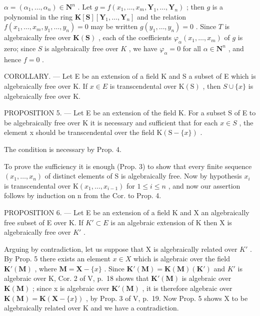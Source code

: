 \(\alpha = (\alpha_{1}, \ldots, \alpha_{n}) \in \mathbf{N}^{n}\) . Let \(g = f(x_{1}, \ldots, x_{m}, \mathbf{Y}_{1}, \ldots, \mathbf{Y}_{n})\) ; then \(g\) is a polynomial in the ring \(\mathbf{K}[\mathbf{S}][\mathbf{Y}_{1}, \ldots, \mathbf{Y}_{n}]\) and the relation \(f(x_{1}, \ldots, x_{m}, y_{1}, \ldots, y_{n}) = 0\) may be written \(g(y_{1}, \ldots, y_{n}) = 0\) . Since \(T\) is algebraically free over \(\mathbf{K}(\mathbf{S})\) , each of the coefficients \(\varphi_{\alpha}(x_{1}, \ldots, x_{m})\) of \(g\) is zero; since \(S\) is algebraically free over \(K\) , we have \(\varphi_{\alpha} = 0\) for all \(\alpha \in \mathbf{N}^{n}\) , and hence \(f = 0\) .

COROLLARY. --- Let E be an extension of a field K and S a subset of E which is algebraically free over K. If \(x \in E\) is transcendental over \(\mathrm{K}(\mathrm{S})\) , then \(S \cup \{x\}\) is algebraically free over K.

PROPOSITION 5. --- Let E be an extension of the field K. For a subset S of E to be algebraically free over K it is necessary and sufficient that for each \(x \in S\) , the element x should be transcendental over the field \(\mathrm{K}(\mathrm{S} - \{x\})\) .

The condition is necessary by Prop. 4.

To prove the sufficiency it is enough (Prop. 3) to show that every finite sequence \((x_{1},\ldots,x_{n})\) of distinct elements of S is algebraically free. Now by hypothesis \(x_{i}\) is transcendental over \(\mathrm{K}(x_{1},\ldots,x_{i-1})\) for \(1\leqslant i\leqslant n\) , and now our assertion follows by induction on n from the Cor. to Prop. 4.

PROPOSITION 6. --- Let E be an extension of a field K and X an algebraically free subset of E over K. If \(K' \subset E\) is an algebraic extension of K then X is algebraically free over \(K'\) .

Arguing by contradiction, let us suppose that X is algebraically related over \(K'\) . By Prop. 5 there exists an element \(x \in X\) which is algebraic over the field \(\mathbf{K}'(\mathbf{M})\) , where \(\mathbf{M} = \mathbf{X} - \{x\}\) . Since \(\mathbf{K}'(\mathbf{M}) = \mathbf{K}(\mathbf{M})(\mathbf{K}')\) and \(K'\) is algebraic over K, Cor. 2 of V, p.~18 shows that \(\mathbf{K}'(\mathbf{M})\) is algebraic over \(\mathbf{K}(\mathbf{M})\) ; since x is algebraic over \(\mathbf{K}'(\mathbf{M})\) , it is therefore algebraic over \(\mathbf{K}(\mathbf{M}) = \mathbf{K}(\mathbf{X} - \{x\})\) , by Prop. 3 of V, p.~19. Now Prop. 5 shows X to be algebraically related over K and we have a contradiction.

